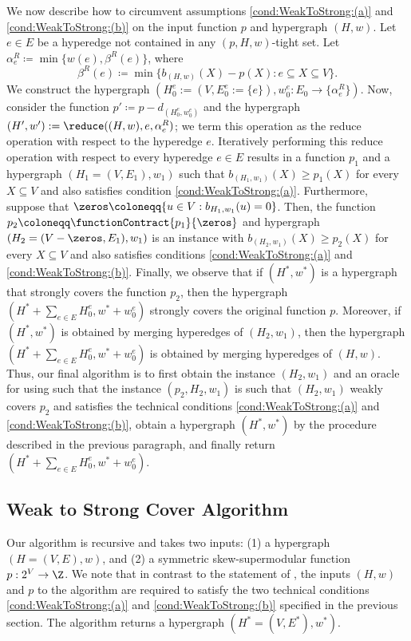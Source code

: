 We now describe how to circumvent assumptions \ref{cond:WeakToStrong:(a)} and \ref{cond:WeakToStrong:(b)} on the input function $p$ and hypergraph $(H,w)$. Let $e \in E$ be a hyperedge not contained in any $(p, H, w)$-tight set. Let $\alpha_e^R \coloneqq  \min\{w(e), \beta^R(e)\}$, where $$\beta^R(e) \coloneqq  \min\{b_{(H,w)}(X) - p(X) : e \subseteq X \subseteq V\}.$$
We construct the hypergraph $(H_0^e:=(V, E_0^e:=\{e\}), w_0^e:E_0\rightarrow \{\alpha^R_e\})$. Now, consider the function $p' \coloneqq  p - d_{(H_0^e, w_0^e)}$ and the  hypergraph $(H', w'):=\reduce((H, w), e, \alpha^R_e)$; we term this operation as the reduce operation with respect to the hyperedge $e$. 
Iteratively performing this reduce operation with respect to every hyperedge $e \in E$ results in a function $p_1$ and a hypergraph $(H_1 = (V, E_1), w_1)$ such that $b_{(H_1, w_1)}(X)\ge p_1(X)$ for every $X\subseteq V$ and also satisfies condition \ref{cond:WeakToStrong:(a)}. Furthermore, suppose that $\zeros \coloneqq  \{u \in V : b_{H_1, w_1}(u) = 0\}$. Then, the function $p_2 \coloneqq  \functionContract{p_1}{\zeros}$ and hypergraph $(H_2 = (V - \zeros, E_1), w_1)$ is an instance with $b_{(H_2, w_1)}(X)\ge p_2(X)$ for every $X\subseteq V$ and also satisfies conditions \ref{cond:WeakToStrong:(a)} and \ref{cond:WeakToStrong:(b)}. Finally, we observe that if $(H^*, w^*)$ is a hypergraph that strongly covers the function $p_2$, then the hypergraph $(H^*+\sum_{e \in E}H_0^e, w^*+w_0^e)$ strongly covers the original function $p$. Moreover,  if $(H^*, w^*)$ is obtained by merging hyperedges of $(H_2, w_1)$, then the  hypergraph $(H^*+\sum_{e \in E}H_0^e, w^*+w_0^e)$ is obtained by merging hyperedges of $(H, w)$. Thus, our final algorithm is to first obtain the instance $(H_2, w_1)$ and an oracle for  using  such that the instance $(p_2, H_2, w_1)$ is such that $(H_2, w_1)$ weakly covers $p_2$ and satisfies the technical conditions \ref{cond:WeakToStrong:(a)} and \ref{cond:WeakToStrong:(b)}, obtain a hypergraph $(H^*, w^*)$ by the procedure described in the previous paragraph, and finally return $(H^*+\sum_{e \in E}H_0^e, w^*+w_0^e)$. 

\subsection{Weak to Strong Cover Algorithm}\label{sec:WeakToStrongCover:Algorithm}
Our algorithm is recursive and takes two inputs: (1) a hypergraph $(H = (V, E), w)$, and (2) a symmetric skew-supermodular function $p:2^V \rightarrow\Z$. We note that in contrast to the statement of , the inputs $(H,w)$ and $p$ to the algorithm are required to satisfy the two technical conditions 
\ref{cond:WeakToStrong:(a)} and \ref{cond:WeakToStrong:(b)} specified in the previous section. The algorithm returns a hypergraph $\left(H^*= \left(V, E^*\right), w^*\right)$. 

